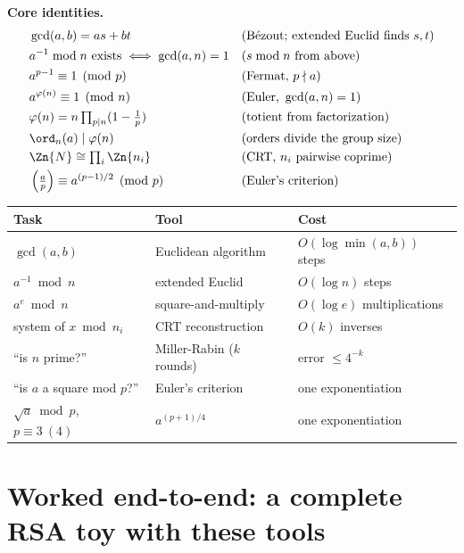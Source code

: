 \begin{focusbox}
\textbf{Core identities.}
\[
\begin{aligned}
&\gcd(a,b) = as+bt && \text{(B\'ezout; extended Euclid finds }s,t)\\
&a^{-1}\bmod n \text{ exists} \iff \gcd(a,n)=1 && (s\bmod n \text{ from above})\\
&a^{p-1}\equiv 1 \pmod p && \text{(Fermat, }p\nmid a)\\
&a^{\varphi(n)}\equiv 1 \pmod n && \text{(Euler, }\gcd(a,n)=1)\\
&\varphi(n) = n\textstyle\prod_{p\mid n}(1-\tfrac1p) && \text{(totient from factorization)}\\
&\ord_n(a) \mid \varphi(n) && \text{(orders divide the group size)}\\
&\Zn{N}\cong \textstyle\prod_i \Zn{n_i} && \text{(CRT, }n_i\text{ pairwise coprime)}\\
&\left(\tfrac{a}{p}\right)\equiv a^{(p-1)/2}\pmod p && \text{(Euler's criterion)}
\end{aligned}
\]
\end{focusbox}

\begin{center}
\renewcommand{\arraystretch}{1.25}
\begin{tabular}{@{}lll@{}}
\toprule
\textbf{Task} & \textbf{Tool} & \textbf{Cost}\\
\midrule
$\gcd(a,b)$                  & Euclidean algorithm          & $O(\log\min(a,b))$ steps\\
$a^{-1}\bmod n$              & extended Euclid              & $O(\log n)$ steps\\
$a^e \bmod n$               & square-and-multiply          & $O(\log e)$ multiplications\\
system of $x\bmod n_i$       & CRT reconstruction           & $O(k)$ inverses\\
``is $n$ prime?''            & Miller-Rabin ($k$ rounds)    & error $\le 4^{-k}$\\
``is $a$ a square mod $p$?'' & Euler's criterion            & one exponentiation\\
$\sqrt{a}\bmod p$, $p\equiv 3\ (4)$ & $a^{(p+1)/4}$         & one exponentiation\\
\bottomrule
\end{tabular}
\end{center}

\section{Worked end-to-end: a complete RSA toy with these tools}
\label{ch40:rsa-toy}

